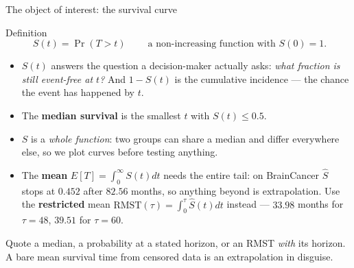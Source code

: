 \documentclass[aspectratio=169,11pt]{beamer}
\begin{document}
\begin{frame}{The object of interest: the survival curve}
  \scriptsize
  \begin{block}{Definition}
    \[
      \boxed{\;S(t)=\Pr(T>t)\;}
      \qquad\text{a non-increasing function with } S(0)=1 .
    \]
  \end{block}
  \begin{readme}
    \begin{itemize}
      \item $S(t)$ answers the question a decision-maker actually asks: \emph{what
            fraction is still event-free at $t$?} And $1-S(t)$ is the cumulative
            incidence --- the chance the event has happened by $t$.
      \item The \textbf{median survival} is the smallest $t$ with $S(t)\le 0.5$.
      \item $S$ is a \emph{whole function}: two groups can share a median and differ
            everywhere else, so we plot curves before testing anything.
      \item The \textbf{mean} $E[T]=\int_0^\infty S(t)dt$ needs the entire tail: on
            BrainCancer $\hat S$ stops at $0.452$ after $82.56$ months, so anything beyond
            is extrapolation. Use the \textbf{restricted} mean
            $\mathrm{RMST}(\tau)=\int_0^\tau \hat S(t)dt$ instead --- $33.98$ months for
            $\tau=48$, $39.51$ for $\tau=60$.
    \end{itemize}
  \end{readme}
  \begin{takeaway}
    Quote a median, a probability at a stated horizon, or an RMST \emph{with} its horizon.
    A bare mean survival time from censored data is an extrapolation in disguise.
  \end{takeaway}
\end{frame}
\end{document}
